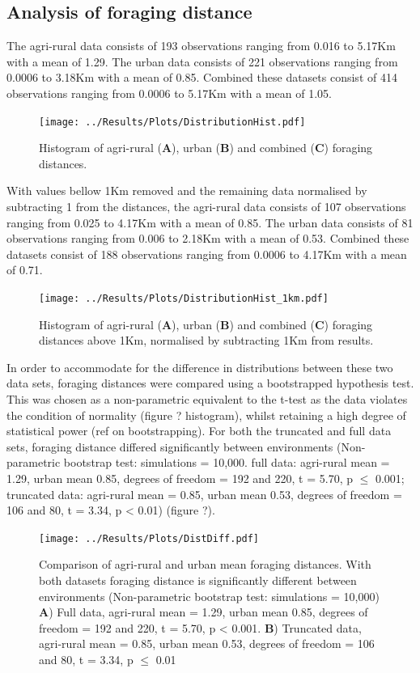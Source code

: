 \documentclass[11pt,usenames,dvipsnames]{article}
\begin{document}
\subsection{Analysis of foraging distance}

The agri-rural data consists of 193 observations ranging from 0.016 to 5.17Km with a mean of 1.29. The urban data consists of 221 observations ranging from 0.0006 to 3.18Km with a mean of 0.85. Combined these datasets consist of 414 observations ranging from 0.0006 to 5.17Km with a mean of 1.05.

\begin{figure}[H]
	\centering
	\texttt{[image: ../Results/Plots/DistributionHist.pdf]}
	\caption{Histogram of agri-rural (\textbf{A}), urban (\textbf{B}) and combined (\textbf{C}) foraging distances.}
\end{figure}

With values bellow 1Km removed and the remaining data normalised by subtracting 1 from the distances, the agri-rural data consists of 107 observations ranging from 0.025 to 4.17Km with a mean of 0.85. The urban data consists of 81 observations ranging from 0.006 to 2.18Km with a mean of 0.53. Combined these datasets consist of 188 observations ranging from 0.0006 to 4.17Km with a mean of 0.71.

\begin{figure}[H]
	\centering
	\texttt{[image: ../Results/Plots/DistributionHist\_1km.pdf]}
	\caption{Histogram of agri-rural (\textbf{A}), urban (\textbf{B}) and combined (\textbf{C}) foraging distances above 1Km, normalised by subtracting 1Km from results.}
\end{figure}

In order to accommodate for the difference in distributions between these two data sets, foraging distances were compared using a bootstrapped hypothesis test. This was chosen as a non-parametric equivalent to the t-test as the data violates the condition of normality (figure ? histogram), whilst retaining a high degree of statistical power (ref on bootstrapping). For both the truncated and full data sets, foraging distance differed significantly between environments (Non-parametric bootstrap test: simulations = 10,000. full data: agri-rural mean = 1.29, urban mean 0.85, degrees of freedom = 192 and 220, t = 5.70, p $\le$ 0.001; truncated data: agri-rural mean = 0.85, urban mean 0.53, degrees of freedom = 106 and 80, t = 3.34, p < 0.01) (figure ?). 

\begin{figure}[H]
	\centering
	\texttt{[image: ../Results/Plots/DistDiff.pdf]}
	\caption{Comparison of agri-rural and urban mean foraging distances. With both datasets foraging distance is significantly different between environments (Non-parametric bootstrap test: simulations = 10,000) \textbf{A}) Full data, agri-rural mean = 1.29, urban mean 0.85, degrees of freedom = 192 and 220, t = 5.70, p < 0.001. \textbf{B}) Truncated data, agri-rural mean = 0.85, urban mean 0.53, degrees of freedom = 106 and 80, t = 3.34, p $\le$ 0.01}
\end{figure}
\end{document}
